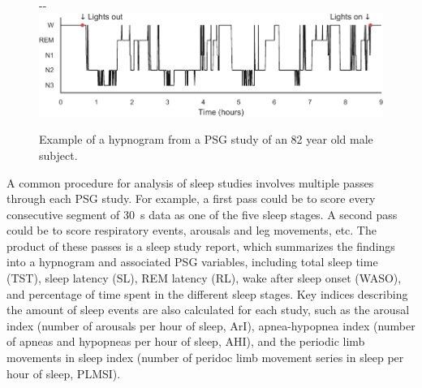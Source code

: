             \begin{figure}
            \begin{adjustwidth*}{}{-\marginparwidth-\marginparsep}
                \includegraphics[width=\textwidth+\marginparwidth+\marginparsep]{figures/clinical-background/hypnogram.pdf}
                \caption[Hypnogram example of male subject]{Example of a hypnogram from a \acs{PSG} study of an 82 year old male subject.}
                \label{fig:clinical-background_hypnogram}
            \end{adjustwidth*}
            \end{figure}
            
            A common procedure for analysis of sleep studies involves multiple passes through each PSG study.
            For example, a first pass could be to score every consecutive segment of \SI{30}{\second} data as one of the five sleep stages.
            A second pass could be to score respiratory events, arousals and leg movements, etc. 
            The product of these passes is a sleep study report, which summarizes the findings into a hypnogram and associated PSG variables, including total sleep time (TST), sleep latency (SL), REM latency (RL), wake after sleep onset (WASO), and percentage of time spent in the different sleep stages.
            Key indices describing the amount of sleep events are also calculated for each study, such as the arousal index (number of arousals per hour of sleep, ArI), apnea-hypopnea index (number of apneas and hypopneas per hour of sleep, AHI), and the periodic limb movements in sleep index (number of peridoc limb movement series in sleep per hour of sleep, PLMSI). 


